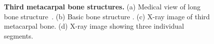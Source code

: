 \begin{figure}[!ht]
\begin{subfigure}[b]{.40\textwidth}
        \caption{}\label{head-base-body}
    \end{subfigure}
    
    \begin{subfigure}[b]{.35\textwidth}
    \centering
        \caption{}\label{zoomed-3meta-3segments-img}
    \end{subfigure}
    \hspace{1cm}
    \begin{subfigure}[b]{.35\textwidth}
    \centering
        \caption{}\label{zoomed-3meta-img}
    \end{subfigure}
   
    \caption{\textbf{Third metacarpal bone structures.} (a) Medical view of long bone structure~\cite{wiki-long-bone}. (b)  Basic bone structure \cite{wiki-bone-structure}. (c) X-ray image of third metacarpal bone. (d) X-ray image showing three individual segments.}
    \label{xray-images}
\end{figure}

